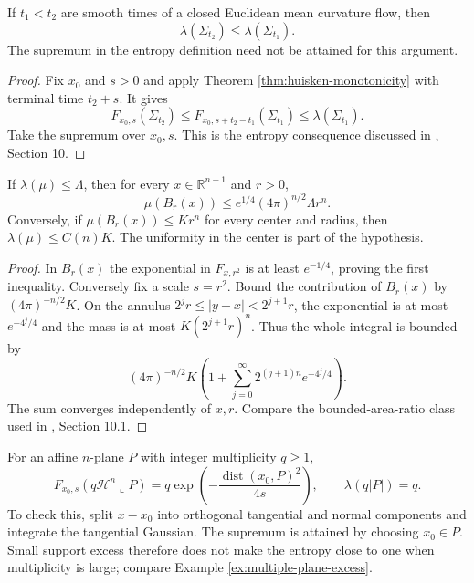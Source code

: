 \begin{proposition}\label{prop:mcf-entropy-monotone}
If $t_1<t_2$ are smooth times of a closed Euclidean mean curvature flow, then
\[
 \lambda(\Sigma_{t_2})\leq\lambda(\Sigma_{t_1}).
\]
The supremum in the entropy definition need not be attained for this argument.
\end{proposition}
\begin{proof}
Fix $x_0$ and $s>0$ and apply Theorem \ref{thm:huisken-monotonicity} with terminal time $t_2+s$. It gives
\[
 F_{x_0,s}(\Sigma_{t_2})\leq
 F_{x_0,s+t_2-t_1}(\Sigma_{t_1})\leq\lambda(\Sigma_{t_1}).
\]
Take the supremum over $x_0,s$. This is the entropy consequence discussed in \cite{WhiMCF15}, Section 10.
\end{proof}

\begin{proposition}\label{prop:mcf-entropy-area-growth}
If $\lambda(\mu)\leq\Lambda$, then for every $x\in\mathbb R^{n+1}$ and $r>0$,
\[
 \mu(B_r(x))\leq e^{1/4}(4\pi)^{n/2}\Lambda r^n.
\]
Conversely, if $\mu(B_r(x))\leq Kr^n$ for every center and radius, then $\lambda(\mu)\leq C(n)K$. The uniformity in the center is part of the hypothesis.
\end{proposition}
\begin{proof}
In $B_r(x)$ the exponential in $F_{x,r^2}$ is at least $e^{-1/4}$, proving the first inequality. Conversely fix a scale $s=r^2$. Bound the contribution of $B_r(x)$ by $(4\pi)^{-n/2}K$. On the annulus $2^jr\leq|y-x|<2^{j+1}r$, the exponential is at most $e^{-4^j/4}$ and the mass is at most $K(2^{j+1}r)^n$. Thus the whole integral is bounded by
\[
 (4\pi)^{-n/2}K\left(1+\sum_{j=0}^\infty2^{(j+1)n}e^{-4^j/4}\right).
\]
The sum converges independently of $x,r$. Compare the bounded-area-ratio class used in \cite{WhiMCF15}, Section 10.1.
\end{proof}

\begin{example}\label{ex:mcf-plane-entropy}
For an affine $n$-plane $P$ with integer multiplicity $q\geq1$,
\[
 F_{x_0,s}(q\mathcal H^n\llcorner P)
 =q\exp\left(-\frac{\operatorname{dist}(x_0,P)^2}{4s}\right),
 \qquad \lambda(q|P|)=q.
\]
To check this, split $x-x_0$ into orthogonal tangential and normal components and integrate the tangential Gaussian. The supremum is attained by choosing $x_0\in P$. Small support excess therefore does not make the entropy close to one when multiplicity is large; compare Example \ref{ex:multiple-plane-excess}.
\end{example}

